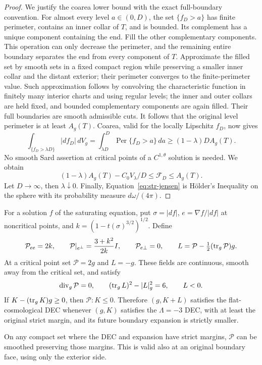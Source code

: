 \begin{proof}
We justify the coarea lower bound with the exact full-boundary
convention. For almost every level $a\in(0,D)$, the set
$\{f_D>a\}$ has finite perimeter, contains an inner collar of $T$,
and is bounded. Its complement has a unique component containing the
end. Fill the other complementary components. This operation can only
decrease the perimeter, and the remaining entire boundary separates
the end from every component of $T$. Approximate the filled set by
smooth sets in a fixed compact region while preserving a smaller
inner collar and the distant exterior; their perimeter converges to
the finite-perimeter value. Such approximation follows by convolving
the characteristic function in finitely many interior charts and
using regular levels; the inner and outer collars are held fixed, and
bounded complementary components are again filled. Their full
boundaries are smooth admissible cuts. It follows that the original
level perimeter is at least $A_g(T)$. Coarea, valid for the locally
Lipschitz $f_D$, now gives
\[
 \int_{\{f_D>\lambda D\}}|df_D|\,dV_g
 =\int_{\lambda D}^{D}\operatorname{Per}\{f_D>a\}\,da
 \geq(1-\lambda)D A_g(T).
\]
No smooth Sard assertion at critical points of a $C^{1,\theta}$
solution is needed. We obtain
\[
 (1-\lambda)A_g(T)-C_0V_\lambda/D
 \leq\mathcal F_D\leq A_g(T).
\]
Let $D\to\infty$, then $\lambda\downarrow0$. Finally,
Equation~\eqref{eq:str-jensen} is H\"older's Inequality on the sphere
with its probability measure $d\omega/(4\pi)$.
\end{proof}

\begin{lemma}
\label{lem:str-stress-identities}
For a solution $f$ of the saturating equation, put
$\sigma=|df|$, $e=\nabla f/|df|$ at noncritical points, and
$k=(1-t(\sigma)^{3/2})^{1/2}$. Define
\begin{equation}
 \mathcal P_{ee}=2k,\qquad
 \mathcal P|_{e^\perp}=\frac{3+k^2}{2k}I,\qquad
 \mathcal P_{e\perp}=0,
 \qquad L=\mathcal P-\tfrac12(\operatorname{tr}_g\mathcal P)g.
 \label{eq:str-stress-definition}
\end{equation}
At a critical point set $\mathcal P=2g$ and $L=-g$. These fields are
continuous, smooth away from the critical set, and satisfy
\begin{equation}
 \operatorname{div}_g\mathcal P=0,
 \qquad (\operatorname{tr}_gL)^2-|L|_g^2=6,
 \qquad L<0.
 \label{eq:str-stress-identities}
\end{equation}
If $K-(\operatorname{tr}_gK)g\geq0$, then $\mathcal P:K\leq0$. Therefore
$(g,K+L)$ satisfies the flat-cosmological DEC whenever $(g,K)$ satisfies
the $\Lambda=-3$ DEC, with at least the original strict margin, and
its future boundary expansion is strictly smaller.

On any compact set where the DEC and expansion have strict margins,
$\mathcal P$ can be smoothed preserving those margins. This is valid
also at an original boundary face, using only the exterior side.
\end{lemma}

